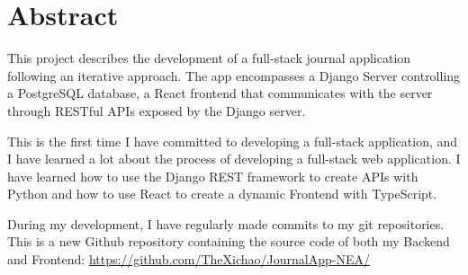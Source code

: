 \chapter{Abstract}
This project describes the development of a full-stack journal application following an iterative approach. The app encompasses a Django Server controlling a PostgreSQL database, a React frontend that communicates with the server through RESTful APIs exposed by the Django server. 

This is the first time I have committed to developing a full-stack application, and I have learned a lot about the process of developing a full-stack web application. I have learned how to use the Django REST framework to create APIs with Python and how to use React to create a dynamic Frontend with TypeScript. 

During my development, I have regularly made commits to my git repositories. This is a new Github repository containing the source code of both my Backend and Frontend: \url{https://github.com/TheXichao/JournalApp-NEA/}